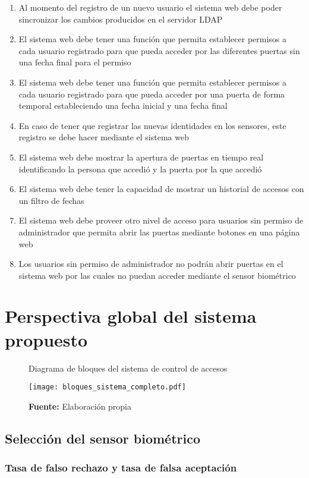 \documentclass[../principal]{subfiles}
\begin{document}
\begin{enumerate}
    \item Al momento del registro de un nuevo usuario el sistema web debe poder sincronizar los cambios producidos en el servidor LDAP
    \item El sistema web debe tener una función que permita establecer permisos a cada usuario registrado para que pueda acceder por las diferentes puertas sin una fecha final para el permiso
    \item El sistema web debe tener una función que permita establecer permisos a cada usuario registrado para que pueda acceder por una puerta de forma temporal estableciendo una fecha inicial y una fecha final
    \item En caso de tener que registrar las nuevas identidades en los sensores, este registro se debe hacer mediante el sistema web
    \item El sistema web debe mostrar la apertura de puertas en tiempo real identificando la persona que accedió y la puerta por la que accedió
    \item El sistema web debe tener la capacidad de mostrar un historial de accesos con un filtro de fechas
    \item El sistema web debe proveer otro nivel de acceso para usuarios sin permiso de administrador que permita abrir las puertas mediante botones en una página web
    \item Los usuarios sin permiso de administrador no podrán abrir puertas en el sistema web por las cuales no puedan acceder mediante el sensor biométrico
  \end{enumerate}

  \section{Perspectiva global del sistema propuesto}

  \begin{figure}[h]
    \centering
    \caption{Diagrama de bloques del sistema de control de accesos}
    \texttt{[image: bloques\_sistema\_completo.pdf]}
    \caption*{\textbf{Fuente:} Elaboración propia}
    \label{fig:bloques_sistema_completo}
  \end{figure}  

  \subsection{Selección del sensor biométrico}

  \subsubsection{Tasa de falso rechazo y tasa de falsa aceptación}
  
\end{document}
